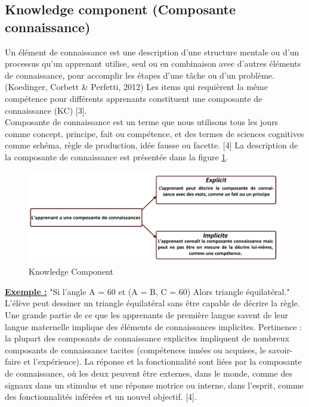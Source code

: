 \subsection{Knowledge component (Composante connaissance)}
Un élément de connaissance est une description d'une structure mentale ou d'un processus qu'un apprenant utilise, seul ou en combinaison avec d'autres éléments de connaissance, pour accomplir les étapes d'une tâche ou d'un problème. (Koedinger, Corbett \& Perfetti, 2012) Les items qui requièrent la même compétence pour différents apprenants constituent une composante de connaissance (KC) [3]. \\
Composante de connaissance est un terme que nous utilisons tous les jours comme concept, principe, fait ou compétence, et des termes de sciences cognitives comme schéma, règle de production, idée fausse ou facette. [4]
La description de la composante de connaissance est présentée dans la figure \ref{knowledge_component}.

\begin{figure}[H]
	\begin{center}
		\includegraphics[width=\textwidth]{images/chapitre3/Knowledge_component.png}
	\end{center}
\caption{Knowledge Component}
\label{knowledge_component}
\end{figure}
\textbf{\underline{Exemple :}}
"Si l'angle A = 60 et (A = B, C = 60) Alors triangle équilatéral." \\
L'élève peut dessiner un triangle équilatéral sans être capable de décrire la règle. Une grande partie de ce que les apprenants de première langue savent de leur langue maternelle implique des éléments de connaissances implicites. Pertinence : la plupart des composants de connaissance explicites impliquent de nombreux composants de connaissance tacites (compétences innées ou acquises, le savoir-faire et l'expérience). La réponse et la fonctionnalité sont liées par la composante de connaissance, où les deux peuvent être externes, dans le monde, comme des signaux dans un stimulus et une réponse motrice ou interne, dans l'esprit, comme des fonctionnalités inférées et un nouvel objectif. [4].

